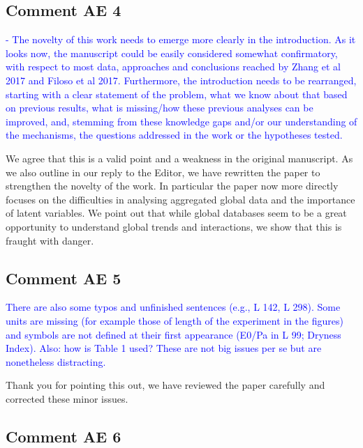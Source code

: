 \documentclass[]{elsarticle} %
\begin{document}
\hypertarget{comment-ae-4}{%
\subsection{Comment AE 4}\label{comment-ae-4}}

\textcolor{blue}{- The novelty of this work needs to emerge more clearly in the introduction. As it looks now, the manuscript could be easily considered somewhat confirmatory, with respect to most data, approaches and conclusions reached by Zhang et al 2017 and Filoso et al 2017. Furthermore, the introduction needs to be rearranged, starting with a clear statement of the problem, what we know about that based on previous results, what is missing/how these previous analyses can be improved, and, stemming from these knowledge gaps and/or our understanding of the mechanisms, the questions addressed in the work or the hypotheses tested.}

We agree that this is a valid point and a weakness in the original manuscript. As we also outline in our reply to the Editor, we have rewritten the paper to strengthen the novelty of the work. In particular the paper now more directly focuses on the difficulties in analysing aggregated global data and the importance of latent variables. We point out that while global databases seem to be a great opportunity to understand global trends and interactions, we show that this is fraught with danger.

\hypertarget{comment-ae-5}{%
\subsection{Comment AE 5}\label{comment-ae-5}}

\textcolor{blue}{There are also some typos and unfinished sentences (e.g., L 142, L 298). Some units are missing (for example those of length of the experiment in the figures) and symbols are not defined at their first appearance (E0/Pa in L 99; Dryness Index). Also: how is Table 1 used? These are not big issues per se but are nonetheless distracting.}

Thank you for pointing this out, we have reviewed the paper carefully and corrected these minor issues.

\hypertarget{comment-ae-6}{%
\subsection{Comment AE 6}\label{comment-ae-6}}
\end{document}
